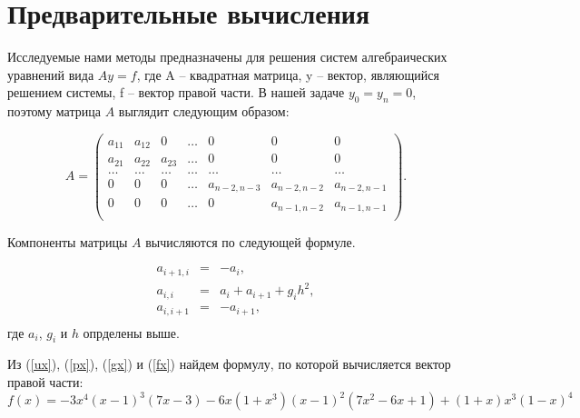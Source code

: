 \section{Предварительные вычисления}

Исследуемые нами методы предназначены для решения систем алгебраических уравнений вида $Ay=f$, где A -- квадратная матрица, y -- вектор, являющийся решением системы, f -- вектор правой части.
В нашей задаче $y_0 = y_n = 0$,  поэтому матрица $A$ выглядит следующим образом:

$$
	A = 
	\left(
	\begin{array}{ccccccc}
		a_{1 1}&a_{1 2}&0&\dots&0&0&0\\
		a_{2 1}&a_{2 2}&a_{2 3}&\dots&0&0&0\\
		\dots&\dots&\dots&\dots&\dots&\dots&\dots\\
		0&0&0&\dots&a_{n-2, n-3}&a_{n-2, n-2}&a_{n-2, n-1}\\
		0&0&0&\dots&0&a_{n-1, n-2}&a_{n-1, n-1}\\
	\end{array}
	\right).
$$

Компоненты матрицы $A$ вычисляются по следующей формуле.

\begin{equation}
	\begin{array}{rcl}
		a_{i+1,i}&=&-a_i,\\
		a_{i, i}&=&a_i+a_{i+1}+g_ih^2,\\
		a_{i, i+1}&=&-a_{i+1},\\
	\end{array}
\end{equation}
где $a_i$, $g_i$ и $h$ опрделены выше.

Из (\ref{ux}), (\ref{px}), (\ref{gx}) и (\ref{fx}) найдем формулу, по которой вычисляется вектор правой части: $$f(x) = -3x^4(x-1)^3(7x-3)-6x(1+x^3)(x-1)^2(7x^2-6x+1)+(1+x)x^3(1-x)^4$$
